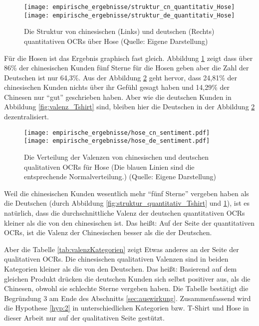 \begin{figure}[htb]
    {\texttt{[image: empirische\_ergebnisse/struktur\_cn\_quantitativ\_Hose]}}    
    {\texttt{[image: empirische\_ergebnisse/struktur\_de\_quantitativ\_Hose]}}   
    \caption[Die Struktur von chinesischen und deutschen quantitativen OCRs über Hose]{Die Struktur von chinesischen (Links) und deutschen (Rechts) quantitativen \ac{OCRs} über Hose (Quelle: Eigene Darstellung)}
    \label{fig:struktur_quantitativ_Hose}
\end{figure}

Für die Hosen ist das Ergebnis graphisch fast gleich. Abbildung \ref{fig:struktur_quantitativ_Hose} zeigt dass über 86\% der chinesischen Kunden fünf Sterne für die Hosen geben aber die Zahl der Deutschen ist nur 64,3\%. Aus der Abbildung \ref{fig:valenz_Hose} geht hervor, dass 24,81\% der chinesischen Kunden nichts über ihr Gefühl gesagt haben und 14,29\% der Chinesen nur ``gut'' geschrieben haben. Aber wie die deutschen Kunden in Abbildung \ref{fig:valenz_Tshirt} sind, bleiben hier die Deutschen in der Abbildung \ref{fig:valenz_Hose} dezentralisiert.
\begin{figure}[htb]
    \texttt{[image: empirische\_ergebnisse/hose\_cn\_sentiment.pdf]}
    \endminipage\hfill
    \texttt{[image: empirische\_ergebnisse/hose\_de\_sentiment.pdf]}
    \endminipage 
    \caption[Die Verteilung der Valenzen von chinesischen und deutschen qualitativen OCRs für Hose]{Die Verteilung der Valenzen von chinesischen und deutschen qualitativen \ac{OCRs} für Hose (Die blauen Linien sind die entsprechende Normalverteilung.) (Quelle: Eigene Darstellung)}
    \label{fig:valenz_Hose}
\end{figure}

Weil die chinesischen Kunden wesentlich mehr ``fünf Sterne'' vergeben haben als die Deutschen (durch Abbildung \ref{fig:struktur_quantitativ_Tshirt} und \ref{fig:struktur_quantitativ_Hose}), ist es natürlich, dass die durchschnittliche Valenz der deutschen quantitativen \ac{OCRs} kleiner als die von den chinesischen ist. Das heißt: Auf der Seite der quantitativen \ac{OCRs}, ist die Valenz der Chinesischen besser als die der Deutschen.

Aber die Tabelle \ref{tab:valenzKategorien} zeigt Etwas anderes an der Seite der qualitativen \ac{OCRs}. Die chinesischen qualitativen Valenzen sind in beiden Kategorien kleiner als die von den Deutschen. Das heißt: Basierend auf dem gleichen Produkt drücken die deutschen Kunden sich selbst positiver aus, als die Chinesen, obwohl sie schlechte Sterne vergeben haben. Die Tabelle bestätigt die Begründung 3 am Ende des Abschnitts \ref{sec:auswirkung}. Zusammenfassend wird die Hypothese \ref{hyp:2} in unterschiedlichen Kategorien \ac{bzw.} T-Shirt und Hose in dieser Arbeit nur auf der qualitativen Seite gestützt.

